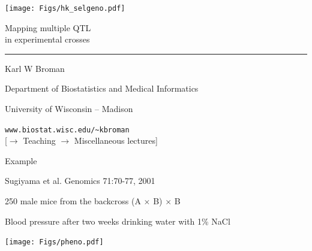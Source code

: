 \documentclass[12pt]{article}
\newcommand{\titlesize}{\fontsize{40}{50} \selectfont}
\newcommand{\headsize}{\fontsize{35}{35} \selectfont}
\newcommand{\textsize}{\fontsize{30}{35} \selectfont}
\newcommand{\smallsize}{\fontsize{25}{30} \selectfont}
\newcommand{\smallersize}{\fontsize{20}{25} \selectfont}
\newcommand{\smallestsize}{\fontsize{18}{22} \selectfont}
\begin{document}
\vfill

\centerline{\texttt{[image: Figs/hk\_selgeno.pdf]}}


\newpage

\thispagestyle{empty}

\begin{center}
\titlesize \color{myyellow}

\vspace*{15mm}

Mapping multiple QTL \\ in experimental crosses

\color{mypink}
\rule{10in}{1mm}

\vspace{5mm}

\textsize \color{myblue}
Karl W Broman
\vspace{5mm}

\color{mywhite}
{\smallsize Department of Biostatistics and Medical Informatics

University of Wisconsin -- Madison
\vspace{20mm}


\verb|www.biostat.wisc.edu/~kbroman| \\
{\smallestsize \color{myblue} 
[$\rightarrow$ Teaching $\rightarrow$ Miscellaneous lectures]}
}

\end{center}

\newpage

\headsize \color{myyellow}
\hfill \begin{minipage}{5.75in}
\centering
Example
\end{minipage}

\vspace{30mm}

\hfill
\begin{minipage}{10in}
\smallersize \color{mywhite}
Sugiyama et al. Genomics 71:70-77, 2001

\vspace{16pt}

\smallestsize
\color{myblue}
250 male mice from the backcross (A $\times$ B) $\times$ B

Blood pressure after two weeks drinking water with 1\% NaCl
\end{minipage}

\vspace{15mm}


\centerline{\texttt{[image: Figs/pheno.pdf]}}
\end{document}
